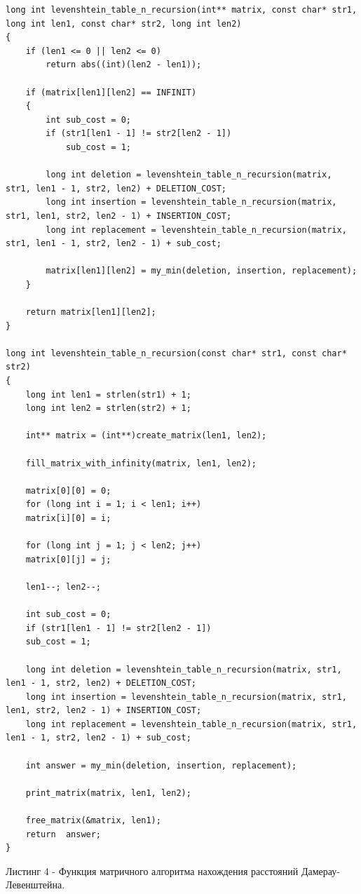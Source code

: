 \documentclass[12pt]{report}
\begin{document}
\begin{lstlisting}
long int levenshtein_table_n_recursion(int** matrix, const char* str1,
long int len1, const char* str2, long int len2)
{
	if (len1 <= 0 || len2 <= 0)
		return abs((int)(len2 - len1));
	
	if (matrix[len1][len2] == INFINIT)
	{
		int sub_cost = 0;
		if (str1[len1 - 1] != str2[len2 - 1])
			sub_cost = 1;
		
		long int deletion = levenshtein_table_n_recursion(matrix, str1, len1 - 1, str2, len2) + DELETION_COST;
		long int insertion = levenshtein_table_n_recursion(matrix, str1, len1, str2, len2 - 1) + INSERTION_COST;
		long int replacement = levenshtein_table_n_recursion(matrix, str1, len1 - 1, str2, len2 - 1) + sub_cost;
		
		matrix[len1][len2] = my_min(deletion, insertion, replacement);
	}
	
	return matrix[len1][len2];
}

long int levenshtein_table_n_recursion(const char* str1, const char* str2)
{
	long int len1 = strlen(str1) + 1;
	long int len2 = strlen(str2) + 1;
	
	int** matrix = (int**)create_matrix(len1, len2);
	
	fill_matrix_with_infinity(matrix, len1, len2);
	
	matrix[0][0] = 0;
	for (long int i = 1; i < len1; i++)
	matrix[i][0] = i;
	
	for (long int j = 1; j < len2; j++)
	matrix[0][j] = j;
	
	len1--; len2--;
	
	int sub_cost = 0;
	if (str1[len1 - 1] != str2[len2 - 1])
	sub_cost = 1;
	
	long int deletion = levenshtein_table_n_recursion(matrix, str1, len1 - 1, str2, len2) + DELETION_COST;
	long int insertion = levenshtein_table_n_recursion(matrix, str1, len1, str2, len2 - 1) + INSERTION_COST;
	long int replacement = levenshtein_table_n_recursion(matrix, str1, len1 - 1, str2, len2 - 1) + sub_cost;
	
	int answer = my_min(deletion, insertion, replacement);
	
	print_matrix(matrix, len1, len2);

	free_matrix(&matrix, len1);
	return  answer;
}
\end{lstlisting}


Листинг 4 - Функция матричного алгоритма нахождения расстояний Дамерау-Левенштейна.
\end{document}
